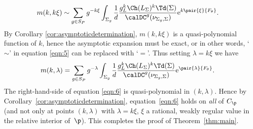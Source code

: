 \begin{gather}\label{eqn:5}
m(k,k\xi)\sim \sum_{g\in S_P} g^{-k\xi} \int_{\Sigma_g} \frac{1}{d}\frac{g_L^k\Ch(L_\Sigma)^k\Td(\Sigma)}{\calDC^g(\nu_{\Sigma_g,\Sigma})}{\rm e}^{k\pair{\xi}{F_\theta}}.
\end{gather}
By Corollary \ref{cor:asymptoticdetermination}, $m(k,k\xi)$ is a quasi-polynomial function of $k$, hence the asymptotic expansion must be exact, or in other words, `$\sim$' in equation \eqref{eqn:5} can be replaced with `$=$'. Thus setting $\lambda=k\xi$ we have
\begin{gather}
\label{eqn:6}
m(k,\lambda)= \sum_{g\in S_P} g^{-\lambda} \int_{\Sigma_g} \frac{1}{d}\frac{g_L^k\Ch(L_\Sigma)^k\Td(\Sigma)}{\calDC^g(\nu_{\Sigma_g,\Sigma})}{\rm e}^{\pair{\lambda}{F_\theta}}.
\end{gather}
The right-hand-side of equation \eqref{eqn:6} is quasi-polynomial in $(k,\lambda)$. Hence by Corollary~\ref{cor:asymptoticdetermination}, equation~\eqref{eqn:6} holds on \emph{all} of $C_\p$ (and not only at points $(k,\lambda)$ with $\lambda=k\xi$, $\xi$ a rational, weakly regular value in the relative interior of~$\p$). This completes the proof of Theorem~\ref{thm:main}.
